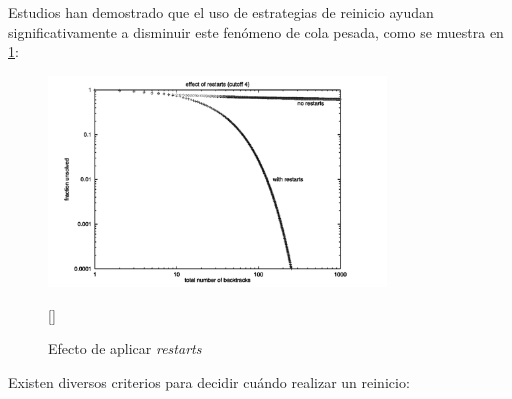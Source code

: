 Estudios han demostrado que el uso de estrategias de reinicio ayudan significativamente a disminuir este fen\'omeno de cola pesada, como se muestra en \ref{fig:restart_efects}:

\begin{figure}[ht]
    \centering
    \includegraphics[width=0.8\textwidth]{Graphics/restart_effects.png}
    \caption{Efecto de aplicar \textit{restarts}}
    [\cite{oliveras2009dpll_cdcl}]
    \label{fig:restart_efects}
\end{figure}

Existen diversos criterios para decidir cuándo realizar un reinicio:

